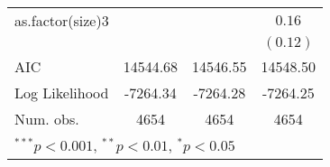 \begin{table}
\begin{center}
\begin{tabular}{l c c c }
as.factor(size)3 &               &               & $0.16$        \\
                 &               &               & $(0.12)$      \\
\hline
AIC              & 14544.68      & 14546.55      & 14548.50      \\
Log Likelihood   & -7264.34      & -7264.28      & -7264.25      \\
Num. obs.        & 4654          & 4654          & 4654          \\
\hline
\multicolumn{4}{l}{\scriptsize{$^{***}p<0.001$, $^{**}p<0.01$, $^*p<0.05$}}
\end{tabular}
\end{center}
\end{table}

